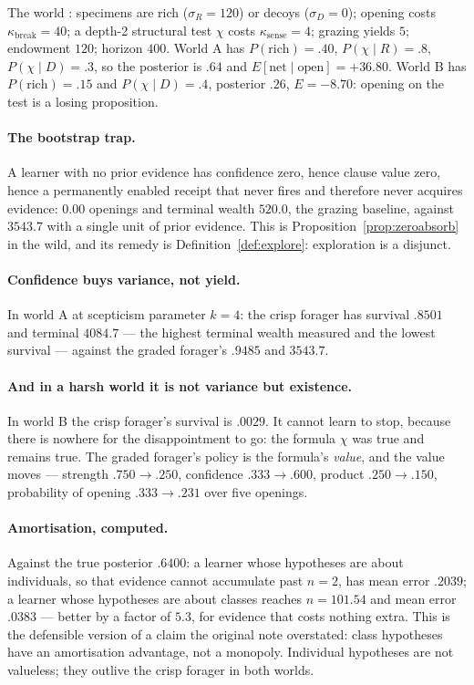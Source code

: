 The world \cite{GradedWhere}: specimens are rich ($\sigma_{R} = 120$) or decoys
($\sigma_{D} = 0$); opening costs $\kappa_{\mathrm{break}} = 40$; a depth-2
structural test $\chi$ costs $\kappa_{\mathrm{sense}} = 4$; grazing yields $5$;
endowment $120$; horizon $400$. World A has $P(\text{rich}) = .40$,
$P(\chi \mid R) = .8$, $P(\chi \mid D) = .3$, so the posterior is $.64$ and
$E[\text{net} \mid \text{open}] = +36.80$. World B has $P(\text{rich}) = .15$ and
$P(\chi \mid D) = .4$, posterior $.26$, $E = -8.70$: opening on the test is a
losing proposition.

\paragraph{The bootstrap trap.} A learner with no prior evidence has confidence
zero, hence clause value zero, hence a permanently enabled receipt that never
fires and therefore never acquires evidence: $0.00$ openings and terminal wealth
$520.0$, the grazing baseline, against $3543.7$ with a single unit of prior
evidence. This is Proposition~\ref{prop:zeroabsorb} in the wild, and its remedy is
Definition~\ref{def:explore}: exploration is a disjunct.

\paragraph{Confidence buys variance, not yield.} In world A at scepticism
parameter $k=4$: the crisp forager has survival $.8501$ and terminal $4084.7$ ---
the highest terminal wealth measured and the lowest survival --- against the graded
forager's $.9485$ and $3543.7$.

\paragraph{And in a harsh world it is not variance but existence.} In world B the
crisp forager's survival is $.0029$. It cannot learn to stop, because there is
nowhere for the disappointment to go: the formula $\chi$ was true and remains
true. The graded forager's policy is the formula's \emph{value}, and the value
moves --- strength $.750 \to .250$, confidence $.333 \to .600$, product
$.250 \to .150$, probability of opening $.333 \to .231$ over five openings.

\paragraph{Amortisation, computed.} Against the true posterior $.6400$: a learner
whose hypotheses are about individuals, so that evidence cannot accumulate past
$n=2$, has mean error $.2039$; a learner whose hypotheses are about classes
reaches $n = 101.54$ and mean error $.0383$ --- better by a factor of $5.3$, for
evidence that costs nothing extra. This is the defensible version of a claim the
original note overstated: class hypotheses have an amortisation advantage, not a
monopoly. Individual hypotheses are not valueless; they outlive the crisp forager
in both worlds.

